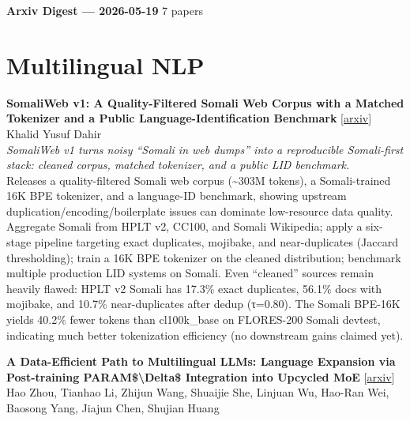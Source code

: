 \documentclass[12pt,letterpaper]{article}
\begin{document}
{\footnotesize\textbf{Arxiv Digest --- 2026-05-19} \hfill 7 papers}

\smallskip

\section*{Multilingual NLP}

{\small\textbf{SomaliWeb v1: A Quality-Filtered Somali Web Corpus with a Matched Tokenizer and a Public Language-Identification Benchmark}} {\scriptsize[\href{https://arxiv.org/abs/2605.18232}{arxiv}]}\\
{\scriptsize Khalid Yusuf Dahir}\\

{\small\textit{SomaliWeb v1 turns noisy ``Somali in web dumps'' into a reproducible Somali-first stack: cleaned corpus, matched tokenizer, and a public LID benchmark.}}\\[1pt]
{\footnotesize Releases a quality-filtered Somali web corpus (\textasciitilde{}303M tokens), a Somali-trained 16K BPE tokenizer, and a language-ID benchmark, showing upstream duplication/encoding/boilerplate issues can dominate low-resource data quality. Aggregate Somali from HPLT v2, CC100, and Somali Wikipedia; apply a six-stage pipeline targeting exact duplicates, mojibake, and near-duplicates (Jaccard thresholding); train a 16K BPE tokenizer on the cleaned distribution; benchmark multiple production LID systems on Somali. Even ``cleaned'' sources remain heavily flawed: HPLT v2 Somali has 17.3\% exact duplicates, 56.1\% docs with mojibake, and 10.7\% near-duplicates after dedup (τ=0.80). The Somali BPE-16K yields 40.2\% fewer tokens than cl100k\_base on FLORES-200 Somali devtest, indicating much better tokenization efficiency (no downstream gains claimed yet).}

\medskip

{\small\textbf{A Data-Efficient Path to Multilingual LLMs: Language Expansion via Post-training PARAM\$\textbackslash{}Delta\$ Integration into Upcycled MoE}} {\scriptsize[\href{https://arxiv.org/abs/2605.18083}{arxiv}]}\\
{\scriptsize Hao Zhou, Tianhao Li, Zhijun Wang, Shuaijie She, Linjuan Wu, Hao-Ran Wei, Baosong Yang, Jiajun Chen, Shujian Huang}\\
\end{document}
